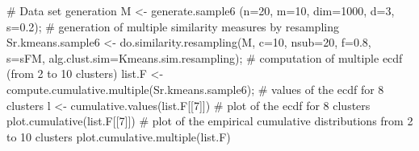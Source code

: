 \documentclass{article}
\begin{document}
\begin{Examples}
\begin{ExampleCode}
# Data set generation
M <- generate.sample6 (n=20, m=10, dim=1000, d=3, s=0.2);
# generation of multiple similarity measures by resampling
Sr.kmeans.sample6 <- do.similarity.resampling(M, c=10, nsub=20, f=0.8, s=sFM, 
                                      alg.clust.sim=Kmeans.sim.resampling); 
# computation of multiple ecdf (from 2 to 10 clusters)
list.F <- compute.cumulative.multiple(Sr.kmeans.sample6);
# values of the ecdf for 8 clusters 
l <- cumulative.values(list.F[[7]])
# plot of the ecdf for 8 clusters
plot.cumulative(list.F[[7]])
# plot of the empirical cumulative distributions from 2 to 10 clusters
plot.cumulative.multiple(list.F)
\end{ExampleCode}
\end{Examples}
\end{document}
